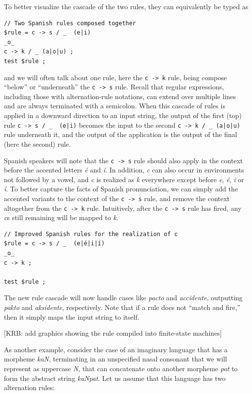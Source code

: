 To better visualize the cascade of the two rules, they can equivalently be typed as

\begin{Verbatim}
// Two Spanish rules composed together
$rule = c -> s / _  (e|i) 
_o_ 
c -> k / _ (a|o|u) ;
test $rule ;
\end{Verbatim}

\noindent
and we will often talk about one rule, here the \texttt{c -> k} rule, being compose ``below'' or
``underneath'' the \texttt{c -> s} rule.  Recall that regular
expressions, including those with alternation-rule notations, can extend
over multiple lines and are always terminated with a semicolon.  When this cascade of rules is applied in a downward direction to an input
string, the output of the first (top) rule \verb!c -> s / _  (e|i)!
becomes the input to the second \verb!c -> k / _ (a|o|u)! rule
underneath it, and the output of the application is the output of the
final (here the second) rule.

Spanish speakers will note that the \texttt{c -> s} rule should also apply in the context
before the accented letters
\emph{é} and \emph{í}.  In addition, \emph{c} can also occur in environments not followed by a vowel,
and \emph{c} is realized as \emph{k} everywhere except before \emph{e}, \emph{é}, \emph{i} or \emph{í}.
To better capture the facts of Spanish pronunciation, 
we can simply add the accented variants to the context of the \texttt{c -> s}
rule, and remove the context altogether from the \texttt{c -> k} rule.  Intuitively, after the \texttt{c -> s}
rule has fired, any \emph{c}s still remaining will be mapped to \emph{k}.

\begin{Verbatim}
// Improved Spanish rules for the realization of c
$rule = c -> s / _  (e|é|i|í)
_o_
c -> k ;

test $rule ;
\end{Verbatim}

\noindent
The new rule cascade will now handle cases like \emph{pacto} and \emph{accidente},
outputting \emph{pakto} and \emph{aksidente}, respectively.  Note that if a rule does not ``match and fire,'' then it simply maps the input string to itself.  

[KRB:  add graphics showing the rule compiled into finite-state
machines]

As another example, consider the case of an imaginary language that has a
morpheme \emph{kaN}, terminating in an unspecified nasal consonant that we will
represent as uppercase \emph{N}, that can concatenate onto another morpheme
\emph{pat} to form the abstract string \emph{kaNpat}.  Let us assume that this language
has two alternation rules:

